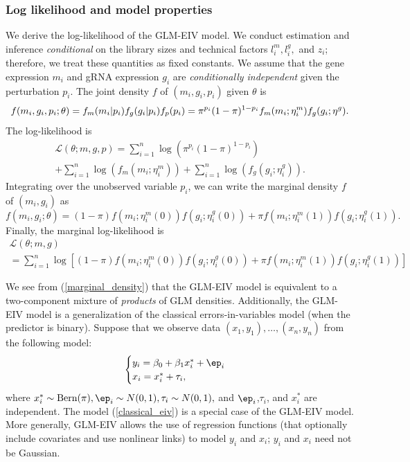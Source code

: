 \documentclass[12pt]{article}
\begin{document}
\subsubsection*{Log likelihood and model properties}
We derive the log-likelihood of the GLM-EIV model. We conduct estimation and inference \textit{conditional} on the library sizes and technical factors $l^m_i, l^g_i,$ and $z_i$; therefore, we treat these quantities as fixed constants. We assume that the gene expression $m_i$ and gRNA expression $g_i$ are \textit{conditionally independent} given the perturbation $p_i$. The joint density $f$ of $(m_i, g_i, p_i)$ given $\theta$ is
\begin{equation}\label{full_density}
f(m_i,g_i,p_i; \theta) = f_m(m_i | p_i) f_g(g_i | p_i) f_p(p_i) \\ = \pi^{p_i}(1-\pi)^{1-p_i} f_m(m_i; \eta^m_i) f_g(g_i; \eta^g).
\end{equation}
The log-likelihood is
\begin{multline}\label{full_log_lik}
\mathcal{L}(\theta; m, g, p) = \sum_{i=1}^n \log\left( \pi^{p_i}(1-\pi)^{1-p_i} \right) \\ + \sum_{i=1}^n \log\left( f_m(m_i; \eta^m_i)\right) + \sum_{i=1}^n \log\left( f_g(g_i; \eta_i^g) \right). \end{multline}
Integrating over the unobserved variable $p_i$, we can write the marginal density $f$ of $(m_i, g_i)$ as
\begin{equation}\label{marginal_density}
f(m_i, g_i; \theta) = (1-\pi) f(m_i; \eta^m_i(0)) f(g_i; \eta^g_i(0)) + \pi f(m_i; \eta^m_i(1)) f(g_i; \eta^g_i(1)).
\end{equation}
Finally, the marginal log-likelihood is
\begin{multline}\label{marginal_log_lik}
\mathcal{L}(\theta; m, g) \\ = \sum_{i=1}^n \log\left[ (1-\pi) f(m_i; \eta^m_i(0)) f(g_i; \eta^g_i(0)) + \pi f(m_i; \eta^m_i(1)) f(g_i; \eta^g_i(1)) \right]
\end{multline}

We see from (\ref{marginal_density}) that the GLM-EIV model is equivalent to a two-component mixture of \textit{products} of GLM densities. Additionally, the GLM-EIV model is a generalization of the classical errors-in-variables model (when the predictor is binary). Suppose that we observe data $(x_1, y_1), \dots, (x_n, y_n)$ from the following model:
\begin{equation}\label{classical_eiv}
\begin{cases}
y_i = \beta_0 + \beta_1 x^*_i + \ep_i \\
x_i = x^*_i + \tau_i,
\end{cases}
\end{equation}
where $x^*_i \sim \textrm{Bern}(\pi), \ep_i \sim N(0,1), \tau_i \sim N(0,1),$ and $\ep_i$,$\tau_i$, and $x^*_i$ are independent. The model (\ref{classical_eiv}) is a special case of the GLM-EIV model. More generally, GLM-EIV allows the use of regression functions (that optionally include covariates and use nonlinear links) to model $y_i$ and $x_i$; $y_i$ and $x_i$ need not be Gaussian.
\end{document}
